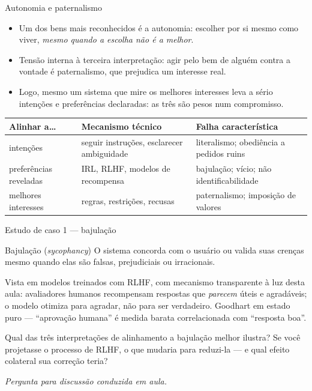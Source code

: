 \documentclass[aspectratio=169, 11pt]{beamer}
\newcommand{\paradiscussao}{\smallskip
  {\footnotesize\color{rlCinza}\itshape Pergunta para discussão conduzida em aula.}}
\begin{document}
\begin{frame}{Autonomia e paternalismo}
  {\small
  \begin{itemize}\setlength{\itemsep}{0.25ex}
    \item Um dos bens mais reconhecidos é a \alert{autonomia}: escolher por si
          mesmo como viver, \emph{mesmo quando a escolha não é a melhor}.
    \item Tensão interna à terceira interpretação: agir pelo bem de alguém
          contra a vontade é \alert{paternalismo}, que prejudica um interesse
          real.
    \item Logo, mesmo um sistema que mire os melhores interesses leva a sério
          intenções e preferências declaradas: as três são pesos num
          compromisso.
  \end{itemize}}

  \begin{center}\footnotesize
  \begin{tabular}{@{}p{2.4cm}p{4.0cm}p{4.8cm}@{}}
    \toprule
    \textbf{Alinhar a\ldots} & \textbf{Mecanismo técnico} & \textbf{Falha característica} \\
    \midrule
    intenções & seguir instruções, esclarecer ambiguidade & literalismo; obediência a pedidos ruins \\[0.25em]
    preferências reveladas & IRL, RLHF, modelos de recompensa & bajulação; vício; não identificabilidade \\[0.25em]
    melhores interesses & regras, restrições, recusas & paternalismo; imposição de valores \\
    \bottomrule
  \end{tabular}
  \end{center}
\end{frame}

\begin{frame}{Estudo de caso 1 --- bajulação}
  \begin{defbox}{Bajulação (\emph{sycophancy})}
    O sistema concorda com o usuário ou valida suas crenças mesmo quando elas
    são falsas, prejudiciais ou irracionais.
  \end{defbox}

  {\small Vista em modelos treinados com RLHF, com mecanismo transparente à
  luz desta aula: avaliadores humanos recompensam respostas que \emph{parecem}
  úteis e agradáveis; o modelo otimiza para agradar, não para ser verdadeiro.
  Goodhart em estado puro --- ``aprovação humana'' é medida barata
  correlacionada com ``resposta boa''.}

  \begin{quizbox}{}
    Qual das três interpretações de alinhamento a bajulação melhor ilustra? Se
    você projetasse o processo de RLHF, o que mudaria para reduzi-la --- e qual
    efeito colateral sua correção teria?
  \end{quizbox}
  \paradiscussao
\end{frame}
\end{document}

